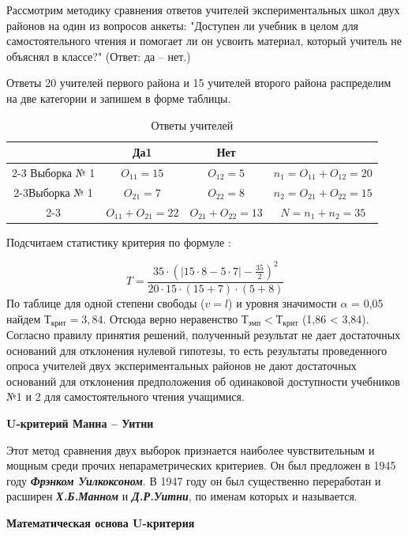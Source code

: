 \documentclass[12pt]{article}
\begin{document}
Рассмотрим методику сравнения ответов учителей экспериментальных школ двух районов на один из вопросов анкеты: "Доступен ли учебник в целом для самостоятельного чтения и помогает ли он усвоить материал, который учитель не объяснял в классе?" (Ответ: да – нет.)

Ответы 20 учителей первого района и 15 учителей второго района распределим на две категории и запишем в форме таблицы.

\begin{table}[h]
    \centering
    \caption{Ответы учителей}
    \bigskip
    \begin{tabular}{c|c|c|c} 
         &Да1&Нет&  \\
         \cline{2-3} Выборка № 1&\textit{$O_{11} = 15$}&\textit{$O_{12} = 5$}&\textit{$n_1 = O_{11} + O_{12} = 20$} \\
         \cline{2-3}Выборка № 1&\textit{$O_{21} = 7$}&\textit{$O_{22} = 8$}&\textit{$n_2 = O_{21} + O_{22} = 15$} \\
         \cline{2-3}&\textit{$O_{11} + O_{21} = 22$}&\textit{$O_{21} + O_{22} = 13$}&\textit{$N = n_1 + n_2 = 35$}  \\
    \end{tabular}
\end{table}

Подсчитаем статистику критерия по формуле :

$$
    T=\frac{35 \cdot (|15 \cdot 8 - 5 \cdot 7| - \frac{35}{2})^2}{20 \cdot 15 \cdot (15 + 7) \cdot (5 + 8)}
$$
По таблице для одной степени свободы ($v = l$) и уровня значимости $\alpha$ = 0,05 найдем $Т_{крит} = 3,84$. Отсюда верно неравенство $Т_{эмп} < Т_{крит}$ (1,86 < 3,84). Согласно правилу принятия решений, полученный результат не дает достаточных оснований для отклонения нулевой гипотезы, то есть результаты проведенного опроса учителей двух экспериментальных районов не дают достаточных оснований для отклонения предположения об одинаковой доступности учебников №1 и 2 для самостоятельного чтения учащимися.

\medskip
\textbf{U-критерий Манна – Уитни}

\medskip
Этот метод сравнения двух выборок признается наиболее чувствительным и мощным среди прочих непараметрических критериев. Он был предложен в 1945 году \textbf{\textit{Фрэнком Уилкоксоном}}. В 1947 году он был существенно переработан и расширен \textbf{\textit{Х.Б.Манном}} и \textbf{\textit{Д.Р.Уитни}}, по именам которых и называется.

\medskip
\textbf{Математическая основа U-критерия}
\end{document}
